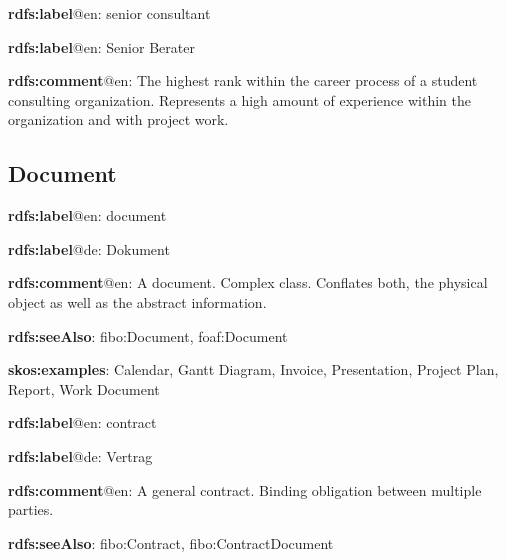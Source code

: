 \documentclass[a4paper, DIV=13, BCOR=0cm]{scrbook}
\begin{document}
\begin{mdframed}[style=onto-3, frametitle={Senior\_Consultant}]
	{%
		\begin{compactitem}
			\item \textbf{rdfs:label}@en: senior consultant
			\item \textbf{rdfs:label}@en: Senior Berater
			\item \textbf{rdfs:comment}@en: The highest rank within the career process of a student consulting organization. Represents a high amount of experience within the organization and with project work.
		\end{compactitem}
	} %
\end{mdframed}

\subsection{Document}
\begin{mdframed}[style=onto, frametitle={Document}]
	{%
		\begin{compactitem}
			\item \textbf{rdfs:label}@en: document
			\item \textbf{rdfs:label}@de: Dokument
			\item \textbf{rdfs:comment}@en: A document. Complex class. Conflates both, the physical object as well as the abstract information.
			\item \textbf{rdfs:seeAlso}: fibo:Document, foaf:Document
			\item \textbf{skos:examples}: Calendar, Gantt Diagram, Invoice, Presentation, Project Plan, Report, Work Document
		\end{compactitem}
	} %
\end{mdframed}

\begin{mdframed}[style=onto-1, frametitle={Contract}]
	{%
		\begin{compactitem}
			\item \textbf{rdfs:label}@en: contract
			\item \textbf{rdfs:label}@de: Vertrag
			\item \textbf{rdfs:comment}@en: A general contract. Binding obligation between multiple parties.
			\item \textbf{rdfs:seeAlso}: fibo:Contract, fibo:ContractDocument
		\end{compactitem}
	} %
\end{mdframed}
\end{document}

